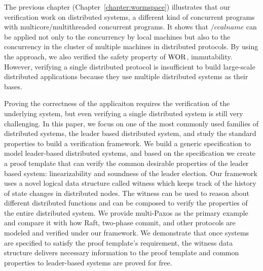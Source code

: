 
The previous chapter (Chapter~\ref{chapter:wormspace}) illustrates that our verification work on distributed systems, 
a different kind of concurrent programs with multicore/multithreaded concurrent programs. 
It shows 
that $/ccalname$ can be applied not only to the concurrency by local machines
but also to the concurrency in the cluster of multiple machines in distributed protocols. 
By using the approach, we also verified the safety property of $\mathrm{WOR}$, immutability. 
However, verifying a single distributed protocol is insufficient to build large-scale distributed applications because they use multiple distributed systems as their bases.

Proving the correctness of the applicaiton requires the verification of the underlying system, but even verifying a single distributed system is
still very challenging. In this paper, we focus on one of the most commonly
used families of distributed systems, the leader based distributed system, and study the standard properties to build a verification framework.
We build a generic specification to model leader-based distributed systems, and based on
the specification we create a proof template that can verify the common
desirable properties of the leader based system: linearizability and soundness of
the leader election. 
Our framework uses a novel logical data structure called witness which keeps track of the history of state changes in distributed nodes.
The witness can be used to reason about different distributed functions and can
be composed to verify the properties of the entire distributed system. We provide
multi-Paxos as the primary example and compare it with
how Raft, two-phase commit, and other protocols are modeled and verified under
our framework. 
We demonstrate that once systems are specified to satisfy the proof template's requirement, the witness data structure delivers necessary
information to the proof template and common properties to leader-based systems are proved for free. 






